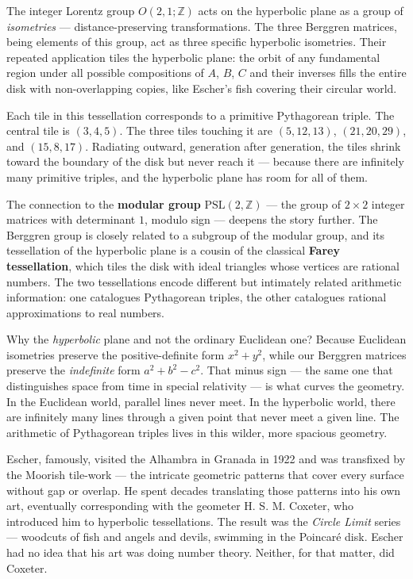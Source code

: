 The integer Lorentz group \(O(2,1; \mathbb{Z})\) acts on the hyperbolic plane as a group of \emph{isometries} --- distance-preserving transformations. The three Berggren matrices, being elements of this group, act as three specific hyperbolic isometries. Their repeated application tiles the hyperbolic plane: the orbit of any fundamental region under all possible compositions of \(A\), \(B\), \(C\) and their inverses fills the entire disk with non-overlapping copies, like Escher's fish covering their circular world.

Each tile in this tessellation corresponds to a primitive Pythagorean triple. The central tile is \((3, 4, 5)\). The three tiles touching it are \((5, 12, 13)\), \((21, 20, 29)\), and \((15, 8, 17)\). Radiating outward, generation after generation, the tiles shrink toward the boundary of the disk but never reach it --- because there are infinitely many primitive triples, and the hyperbolic plane has room for all of them.

The connection to the \textbf{modular group} \(\text{PSL}(2, \mathbb{Z})\) --- the group of \(2 \times 2\) integer matrices with determinant \(1\), modulo sign --- deepens the story further. The Berggren group is closely related to a subgroup of the modular group, and its tessellation of the hyperbolic plane is a cousin of the classical \textbf{Farey tessellation}, which tiles the disk with ideal triangles whose vertices are rational numbers. The two tessellations encode different but intimately related arithmetic information: one catalogues Pythagorean triples, the other catalogues rational approximations to real numbers.

Why the \emph{hyperbolic} plane and not the ordinary Euclidean one? Because Euclidean isometries preserve the positive-definite form \(x^2 + y^2\), while our Berggren matrices preserve the \emph{indefinite} form \(a^2 + b^2 - c^2\). That minus sign --- the same one that distinguishes space from time in special relativity --- is what curves the geometry. In the Euclidean world, parallel lines never meet. In the hyperbolic world, there are infinitely many lines through a given point that never meet a given line. The arithmetic of Pythagorean triples lives in this wilder, more spacious geometry.

Escher, famously, visited the Alhambra in Granada in 1922 and was transfixed by the Moorish tile-work --- the intricate geometric patterns that cover every surface without gap or overlap. He spent decades translating those patterns into his own art, eventually corresponding with the geometer H. S. M. Coxeter, who introduced him to hyperbolic tessellations. The result was the \emph{Circle Limit} series --- woodcuts of fish and angels and devils, swimming in the Poincaré disk. Escher had no idea that his art was doing number theory. Neither, for that matter, did Coxeter.


